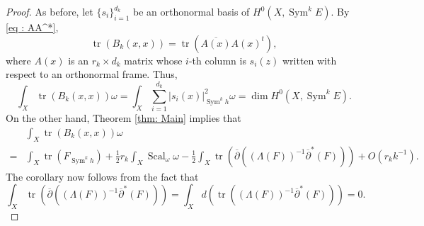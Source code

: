 \documentclass{amsart}
\theoremstyle{definition}
\theoremstyle{remark}
\numberwithin{equation}{section}
\DeclareMathOperator{\Sym}{Sym}
\DeclareMathOperator{\tr}{tr}
\DeclareMathOperator{\Scal}{Scal}
\begin{document}
\begin{proof}
As before, let $\{s_i\}_{i=1}^{d_k}$ be an orthonormal basis of $H^0(X, \Sym^k E)$. By \eqref{eq : AA^*},
\begin{equation*}
\tr (B_k(x,x)) = \tr\left ( \overline{A(x)}A(x)^t \right ),
\end{equation*}
where $A(x)$ is an $r_k \times d_k$ matrix whose $i$-th column is $s_i(z)$ written with respect to an orthonormal frame. Thus,
\begin{equation*}
    \int_X \tr (B_k(x,x)) \omega = \int_X \sum_{i=1}^{d_k} |s_i(x)|_{\Sym^k h}^2 \omega = \dim H^0(X, \Sym^k E).
\end{equation*}
On the other hand, Theorem \ref{thm: Main} implies that
\begin{equation*}
\begin{split}
    & \int_X \tr (B_k(x,x)) \omega \\
    = & \int_X \tr(F_{\Sym^k h}) + \frac{1}{2} r_k \int_X \Scal_\omega \omega  -\frac{1}{2} \int_X  \tr\left (  \overline{\partial} \left ( (\Lambda (F) )^{-1} \overline{\partial}^* (F) \right ) \right ) +  O(r_k k^{-1}).
\end{split}
\end{equation*}
The corollary now follows from the fact that
\begin{equation*}
    \int_X  \tr\left (  \overline{\partial} \left ( (\Lambda (F) )^{-1} \overline{\partial}^* (F) \right ) \right ) =  \int_X d \left (\tr \left (   (\Lambda (F) )^{-1} \overline{\partial}^* (F) \right ) \right ) = 0.
\end{equation*}
\end{proof}
\end{document}
